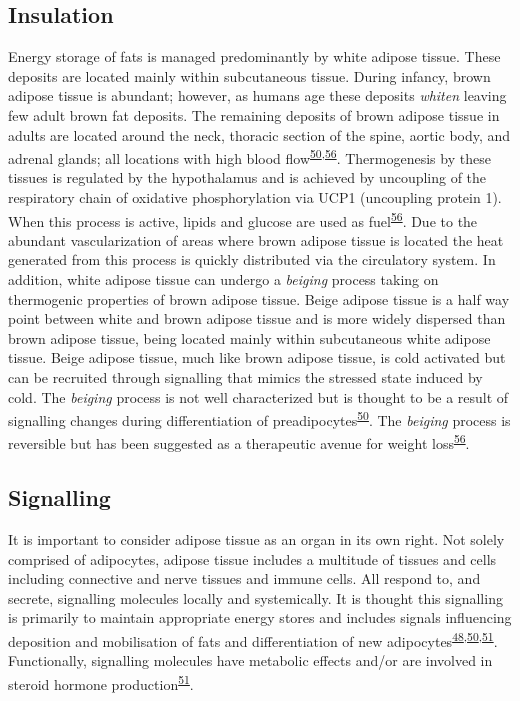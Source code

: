 \documentclass[11pt,twoside]{bristolthesis}
\begin{document}
\hypertarget{insulation}{%
\subsection{Insulation}\label{insulation}}

Energy storage of fats is managed predominantly by white adipose tissue. These deposits are located mainly within subcutaneous tissue. During infancy, brown adipose tissue is abundant; however, as humans age these deposits \emph{whiten} leaving few adult brown fat deposits. The remaining deposits of brown adipose tissue in adults are located around the neck, thoracic section of the spine, aortic body, and adrenal glands; all locations with high blood flow\textsuperscript{\protect\hyperlink{ref-Luo2016}{50},\protect\hyperlink{ref-Cannon2004}{56}}. Thermogenesis by these tissues is regulated by the hypothalamus and is achieved by uncoupling of the respiratory chain of oxidative phosphorylation via UCP1 (uncoupling protein 1). When this process is active, lipids and glucose are used as fuel\textsuperscript{\protect\hyperlink{ref-Cannon2004}{56}}. Due to the abundant vascularization of areas where brown adipose tissue is located the heat generated from this process is quickly distributed via the circulatory system. In addition, white adipose tissue can undergo a \emph{beiging} process taking on thermogenic properties of brown adipose tissue. Beige adipose tissue is a half way point between white and brown adipose tissue and is more widely dispersed than brown adipose tissue, being located mainly within subcutaneous white adipose tissue. Beige adipose tissue, much like brown adipose tissue, is cold activated but can be recruited through signalling that mimics the stressed state induced by cold. The \emph{beiging} process is not well characterized but is thought to be a result of signalling changes during differentiation of preadipocytes\textsuperscript{\protect\hyperlink{ref-Luo2016}{50}}. The \emph{beiging} process is reversible but has been suggested as a therapeutic avenue for weight loss\textsuperscript{\protect\hyperlink{ref-Cannon2004}{56}}.

\hypertarget{signalling}{%
\subsection{Signalling}\label{signalling}}

It is important to consider adipose tissue as an organ in its own right. Not solely comprised of adipocytes, adipose tissue includes a multitude of tissues and cells including connective and nerve tissues and immune cells. All respond to, and secrete, signalling molecules locally and systemically. It is thought this signalling is primarily to maintain appropriate energy stores and includes signals influencing deposition and mobilisation of fats and differentiation of new adipocytes\textsuperscript{\protect\hyperlink{ref-Frayn2003}{48},\protect\hyperlink{ref-Luo2016}{50},\protect\hyperlink{ref-Kershaw2004}{51}}. Functionally, signalling molecules have metabolic effects and/or are involved in steroid hormone production\textsuperscript{\protect\hyperlink{ref-Kershaw2004}{51}}.
\end{document}
